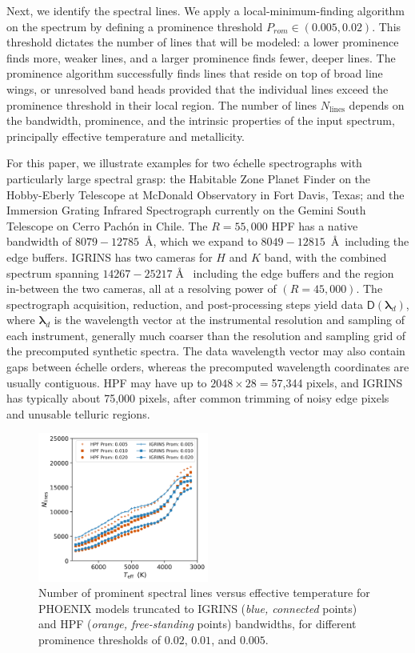 \documentclass[modern]{aastex631}
\begin{document}
Next, we identify the spectral lines. We apply a local-minimum-finding algorithm on the spectrum by defining a prominence threshold $P_{rom} \in (0.005, 0.02)$. This threshold dictates the number of lines that will be modeled: a lower prominence finds more, weaker lines, and a larger prominence finds fewer, deeper lines. The prominence algorithm successfully finds lines that reside on top of broad line wings, or unresolved band heads provided that the individual lines exceed the prominence threshold in their local region. The number of lines $N_{\mathrm{lines}}$ depends on the bandwidth, prominence, and the intrinsic properties of the input spectrum, principally effective temperature and metallicity.

For this paper, we illustrate examples for two \'echelle spectrographs with particularly large spectral grasp: the Habitable Zone Planet Finder \citep[HPF,][]{2014SPIE.9147E..1GM} on the Hobby-Eberly Telescope at McDonald Observatory in Fort Davis, Texas; and the Immersion Grating Infrared Spectrograph \citep[IGRINS,][]{park14}
currently on the Gemini South Telescope on Cerro Pach\'on in Chile. The $R=55,000$ HPF has a native bandwidth of $8079-12785$~\AA, which we expand to $8049-12815$~\AA~including the edge buffers. IGRINS has two cameras for $H$ and $K$ band, with the combined spectrum spanning $14267-25217\;$\AA~ including the edge buffers and the region in-between the two cameras, all at a resolving power of $(R=45,000)$. The spectrograph acquisition, reduction, and post-processing steps yield data $\mathsf{D}(\bm{\lambda}_{d})$, where $\bm{\lambda}_{d}$ is the wavelength vector at the instrumental resolution and sampling of each instrument, generally much coarser than the resolution and sampling grid of the precomputed synthetic spectra. The data wavelength vector may also contain gaps between \'echelle orders, whereas the precomputed wavelength coordinates are usually contiguous. HPF may have up to $2048\times28=$57,344 pixels, and IGRINS has typically about 75,000 pixels, after common trimming of noisy edge pixels and unusable telluric regions.


\begin{figure}[hbt!]
 \centering
 \includegraphics[width=0.5\textwidth]{figures/N_lines_vs_Teff_prom.png}
 \caption{Number of prominent spectral lines versus effective temperature for PHOENIX models truncated to IGRINS (\emph{blue, connected} points) and HPF (\emph{orange, free-standing} points) bandwidths, for different prominence thresholds of $0.02$, $0.01$, and $0.005$.}
 \label{fig_Nlines_vs_teff}
\end{figure}
\end{document}

